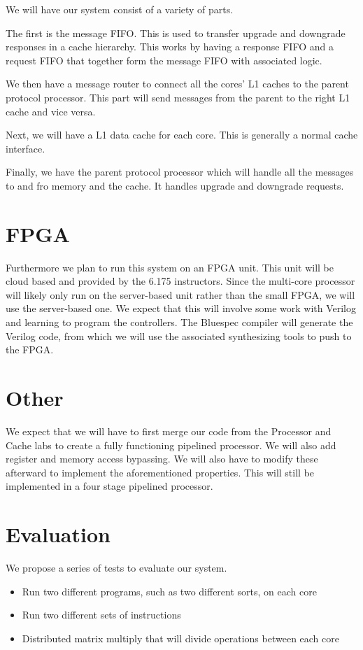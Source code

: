 \documentclass{article}
\begin{document}
We will have our system consist of a variety of parts. 

The first is the message FIFO. This is used to transfer upgrade and downgrade responses in a cache hierarchy. This works by having a response FIFO and a request FIFO that together form the message FIFO with associated logic. 

We then have a message router to connect all the cores' L1 caches to the parent protocol processor. This part will send messages from the parent to the right L1 cache and vice versa. 

Next, we will have a L1 data cache for each core. This is generally a normal cache interface.

Finally, we have the parent protocol processor which will handle all the messages to and fro memory and the cache. It handles upgrade and downgrade requests. 

\section{FPGA}
Furthermore we plan to run this system on an FPGA unit. This unit will be cloud based and provided by the 6.175 instructors. Since the multi-core processor will likely only run on the server-based unit rather than the small FPGA, we will use the server-based one. We expect that this will involve some work with Verilog and learning to program the controllers. The Bluespec compiler will generate the Verilog code, from which we will use the associated synthesizing tools to push to the FPGA. 

\section{Other}

We expect that we will have to first merge our code from the Processor and Cache labs to create a fully functioning pipelined processor. We will also add register and memory access bypassing. We will also have to modify these afterward to implement the aforementioned properties. This will still be implemented in a four stage pipelined processor.

\section{Evaluation}

We propose a series of tests to evaluate our system.
\begin{itemize}
    \item Run two different programs, such as two different sorts, on each core
    \item Run two different sets of instructions
    \item Distributed matrix multiply that will divide operations between each core
\end{itemize}
\end{document}
